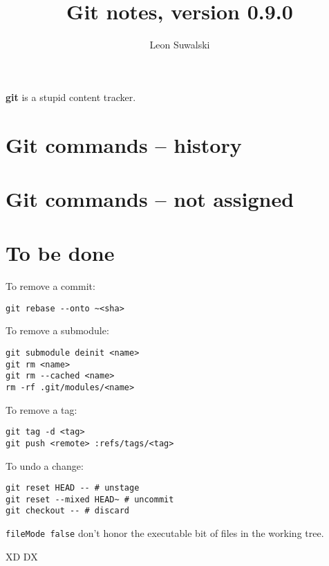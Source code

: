 \documentclass{charuun}
\title{Git notes, version 0.9.0}
\author{Leon Suwalski}
\begin{document}
\maketitle
\raggedright

\textbf{git} is a stupid content tracker.

\section{Git commands -- history}




\section{Git commands -- not assigned}



























\section{To be done}
To remove a commit:
\begin{verbatim}
git rebase --onto ~<sha>
\end{verbatim}

To remove a submodule:
\begin{verbatim}
git submodule deinit <name>
git rm <name>
git rm --cached <name>
rm -rf .git/modules/<name>
\end{verbatim}

To remove a tag:
\begin{verbatim}
git tag -d <tag>
git push <remote> :refs/tags/<tag>
\end{verbatim}

To undo a change:
\begin{verbatim}
git reset HEAD -- # unstage
git reset --mixed HEAD~ # uncommit
git checkout -- # discard
\end{verbatim}

\texttt{fileMode false} don't honor the executable bit of files in the working tree.



XD
DX
\end{document}
